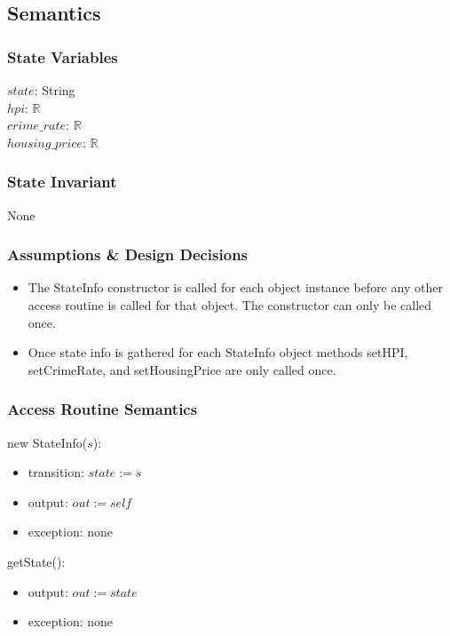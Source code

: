 \documentclass[12pt]{article}
\begin{document}
\subsection* {Semantics}

\subsubsection* {State Variables}

$state$: String\\
$hpi$: $\mathbb{R}$\\
$crime\_rate$: $\mathbb{R}$\\
$housing\_price$: $\mathbb{R}$

\subsubsection* {State Invariant}

None

\subsubsection* {Assumptions \& Design Decisions}

\begin{itemize}
\item The StateInfo constructor is called for each object instance before any
  other access routine is called for that object.  The constructor can only be
  called once.
\item Once state info is gathered for each StateInfo object methods setHPI, setCrimeRate, and setHousingPrice are only called once.
\end{itemize}

\subsubsection* {Access Routine Semantics}

new StateInfo($s$):
\begin{itemize}
\item transition: $state := s$
\item output: $\mathit{out} := \mathit{self}$
\item exception: none
\end{itemize}

\noindent getState():
\begin{itemize}
\item output: $out := state$
\item exception: none
\end{itemize}
\end{document}
